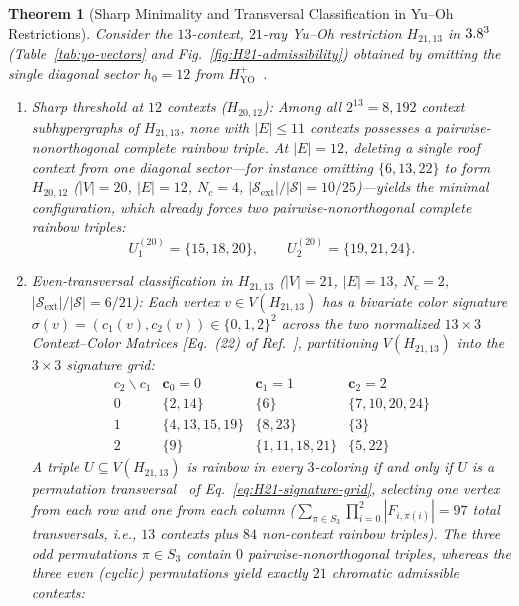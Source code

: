 \documentclass[aps,pra,reprint,superscriptaddress,longbibliography,nofootinbib,floatfix,10pt]{revtex4-2}
\newtheorem{theorem}{Theorem}
\theoremstyle{definition}\newtheorem{definition}[theorem]{Definition}
\theoremstyle{remark}\newtheorem{remark}[theorem]{Remark}
\newcommand{\Sc}{\mathcal S}\newcommand{\Cc}{\mathcal C}\newcommand{\Wc}{\mathcal W}
\newcommand{\YO}{\mathrm{YO}}\newcommand{\ip}[2]{\langle #1,#2\rangle}
\begin{document}
\begin{theorem}[Sharp Minimality and Transversal Classification in Yu--Oh Restrictions]\label{thm:H21-complete}
Consider the $13$-context, $21$-ray Yu--Oh restriction $H_{21,13}$ in $3.8^3$ (Table~\ref{tab:yo-vectors} and Fig.~\ref{fig:H21-admissibility}) obtained by omitting the single diagonal sector $h_0=12$ from $H_{\YO}^+$~\cite{svozil-2026-chromaticcoordinatization,2026-latin-context-matrix}.
\begin{enumerate}
\item \emph{Sharp threshold at $12$ contexts ($H_{20,12}$):} Among all $2^{13}=8{,}192$ context subhypergraphs of $H_{21,13}$, none with $|E|\le 11$ contexts possesses a pairwise-nonorthogonal complete rainbow triple. At $|E|=12$, deleting a single roof context from one diagonal sector---for instance omitting $\{6,13,22\}$ to form $H_{20,12}$ ($|V|=20$, $|E|=12$, $N_c=4$, $|\Sc_{\mathrm{ext}}|/|\Sc|=10/25$)---yields the minimal configuration, which already forces two pairwise-nonorthogonal complete rainbow triples:
\begin{equation}\label{eq:H20-triples}
U_1^{(20)}=\{15,18,20\},\qquad U_2^{(20)}=\{19,21,24\}.
\end{equation}
\item \emph{Even-transversal classification in $H_{21,13}$ ($|V|=21$, $|E|=13$, $N_c=2$, $|\Sc_{\mathrm{ext}}|/|\Sc|=6/21$):} Each vertex $v\in V(H_{21,13})$ has a bivariate color signature $\sigma(v)=(c_1(v),c_2(v))\in\{0,1,2\}^2$ across the two normalized $13\times 3$ Context--Color Matrices [Eq.~(22) of Ref.~\cite{2026-latin-context-matrix}], partitioning $V(H_{21,13})$ into the $3\times 3$ signature grid:
\begin{equation}\label{eq:H21-signature-grid}
\begin{array}{c|ccc}
c_2\backslash c_1 & \mathbf{c}_0=0 & \mathbf{c}_1=1 & \mathbf{c}_2=2\\\hline
0 & \{2,14\} & \{6\} & \{7,10,20,24\}\\
1 & \{4,13,15,19\} & \{8,23\} & \{3\}\\
2 & \{9\} & \{1,11,18,21\} & \{5,22\}
\end{array}
\end{equation}
A triple $U\subseteq V(H_{21,13})$ is rainbow in every $3$-coloring if and only if $U$ is a \emph{permutation transversal}~\cite{wanless2011transversals} of Eq.~\eqref{eq:H21-signature-grid}, selecting one vertex from each row and one from each column ($\sum_{\pi\in S_3}\prod_{i=0}^2 |F_{i,\pi(i)}|=97$ total transversals, i.e., $13$ contexts plus $84$ non-context rainbow triples). The three odd permutations $\pi\in S_3$ contain $0$ pairwise-nonorthogonal triples, whereas the three even (cyclic) permutations yield \emph{exactly $21$ chromatic admissible contexts}:

\end{enumerate}
\end{theorem}
\end{document}
